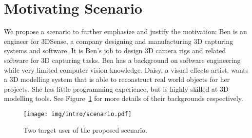 \section{Motivating Scenario}
We propose a scenario to further emphasize and justify the motivation: Ben is an engineer for 3DSense, a company designing and manufacturing 3D capturing systems and software. It is Ben's job to design 3D camera rigs and related software for 3D capturing tasks. Ben has a background on software engineering while very limited computer vision knowledge. Daisy, a visual effects artist, wants a 3D modelling system that is able to reconstruct real world objects for her projects. She has little programming experience, but is highly skilled at 3D modelling tools. See Figure~\ref{fig:scenario_user} for more details of their backgrounds respectively.
\begin{figure}[!htbp]
\centering
\texttt{[image: img/intro/scenario.pdf]}
\caption{Two target user of the proposed scenario.}
\label{fig:scenario_user}
\end{figure}

